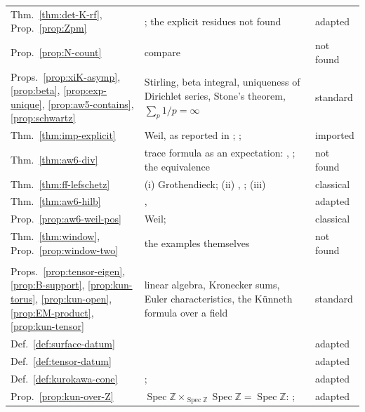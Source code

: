\documentclass[11pt]{amsart}
\theoremstyle{plain}
\theoremstyle{definition}
\theoremstyle{remark}
\numberwithin{equation}{section}
\newcommand{\Z}{\mathbb{Z}}
\DeclareMathOperator{\Spec}{Spec}
\begin{document}
{\begin{longtable}{@{}>{\raggedright\arraybackslash}p{}
>{\raggedright\arraybackslash}p{}
>{\raggedright\arraybackslash}p{}@{}}
Thm.~\ref{thm:det-K-rf}, Prop.~\ref{prop:Zpm} &
\cite[Lemma~(1.7), Theorem~(7.20), and (7.19.1)]{Deninger1994Motivic};
the explicit residues not found & adapted\\
Prop.~\ref{prop:N-count} & compare
\cite[Remark~(3.4)(2)]{Deninger1992Local} & not found\\
Props.~\ref{prop:xiK-asymp}, \ref{prop:beta}, \ref{prop:exp-unique},
\ref{prop:aw5-contains}, \ref{prop:schwartz} & Stirling, beta
integral, uniqueness of Dirichlet series, Stone's theorem,
$\sum_p1/p=\infty$ & standard\\
Thm.~\ref{thm:imp-explicit} & Weil, as reported in
\cite[\S V]{Bombieri2000Clay};
\cite[Theorem~4.1]{Deninger2001NumberTheory};
\cite{Barner1981Explicit} & imported\\
Thm.~\ref{thm:aw6-div} & trace formula as an expectation:
\cite[(10)]{Deninger1998Analogies},
\cite[(19)]{Deninger2001NumberTheory}; the equivalence & not found\\
Thm.~\ref{thm:ff-lefschetz} & (i) Grothendieck; (ii)
\cite[(2), p.~3]{Deninger2002Explicit},
\cite[(10)]{Deninger1998Analogies}; (iii) & classical\\
Thm.~\ref{thm:aw6-hilb} & \cite[p.~33]{Deninger1994Motivic},
\cite[p.~169]{Deninger1998Analogies} & adapted\\
Prop.~\ref{prop:aw6-weil-pos} & Weil;
\cite[\S V, p.~9]{Bombieri2000Clay} & classical\\
Thm.~\ref{thm:window}, Prop.~\ref{prop:window-two} & the examples
themselves & not found\\
\multicolumn{3}{@{}l}{\emph{Section~\ref{sec:kunneth}}}\\
Props.~\ref{prop:tensor-eigen}, \ref{prop:B-support},
\ref{prop:kun-torus}, \ref{prop:kun-open}, \ref{prop:EM-product},
\ref{prop:kun-tensor} & linear algebra, Kronecker sums, Euler
characteristics, the K\"unneth formula over a field & standard\\
Def.~\ref{def:surface-datum} & \cite[\S1.2, p.~363, and
p.~360]{Kleiman1968Cycles} & adapted\\
Def.~\ref{def:tensor-datum} & \cite[\S1.6, p.~133]{Manin1995Lectures}
& adapted\\
Def.~\ref{def:kurokawa-cone} & \cite[p.~219]{Kurokawa1992MultipleZeta};
\cite[\S5.2, p.~158]{Manin1995Lectures} & adapted\\
Prop.~\ref{prop:kun-over-Z} & $\Spec\Z\times_{\Spec\Z}\Spec\Z=\Spec\Z$:
\cite[p.~121]{Manin1995Lectures}; \cite[p.~41]{Deninger1994Motivic}
& adapted\\

\end{longtable}}
\end{document}
